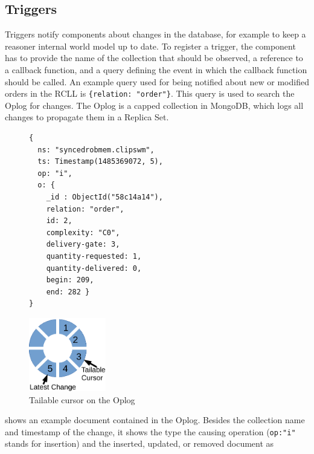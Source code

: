 \subsection{Triggers}
\label{sec:impl-triggers}
Triggers notify components about changes in the database, for example
to keep a reasoner internal world model up to date. To register a trigger,
the component has to provide the name of the
collection that should be observed, a reference to a callback
function, and a query defining the event in which the callback
function should be called. An example query used for being notified
about new or modified orders in the RCLL is \texttt{\{relation:
  "order"\}}. This query is used to search the Oplog for changes. The
Oplog is a capped collection in MongoDB, which logs all changes to
propagate them in a Replica Set.
\begin{figure}
  \vspace{-0.0cm}
\begin{lstlisting}[style=SmallJSON,
  caption={Document in the Oplog},
  label=lst:Oplog,
  framexleftmargin=2pt, xleftmargin=0pt,
 morekeywords={}, numbers=none]
{
  ns: "syncedrobmem.clipswm",
  ts: Timestamp(1485369072, 5),
  op: "i",
  o: {
    _id : ObjectId("58c14a14"),
    relation: "order",
    id: 2,
    complexity: "C0",
    delivery-gate: 3,
    quantity-requested: 1,
    quantity-delivered: 0,
    begin: 209,
    end: 282 }
}
\end{lstlisting}
\vspace{-8mm}
\end{figure}
\begin{figure}
  \centering
  \includegraphics[width=0.3\textwidth]{draw/oplog-cursor}%
  \caption[Tailable cursor on the Oplog]{Tailable cursor on the Oplog}
  \vspace{-4mm}
  \label{fig:oplog-cursor}
\end{figure}
 shows an example document contained in the
Oplog. Besides the collection name and timestamp of the change, it
shows the type the causing operation (\texttt{op:"i"} stands for
insertion) and the inserted, updated, or removed document as
